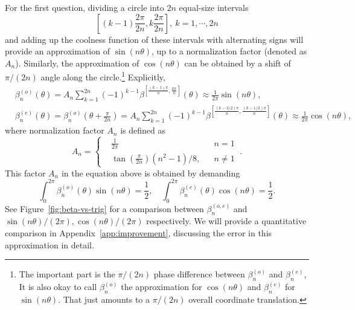 \documentclass[12pt, nofootinbib]{article}
\theoremstyle{plain}
\theoremstyle{assumption}
\theoremstyle{definition}
\theoremstyle{plain}
\theoremstyle{plain}
\theoremstyle{plain}
\theoremstyle{plain}
\theoremstyle{plain}
\def\({\left(}
\def\){\right)}
\def\[{\left[}
\def\]{\right]}
\def\betae{\beta^{(e)}}
\def\betao{\beta^{(o)}}
\begin{document}
For the first question, dividing a circle into $2n$ equal-size intervals 
$$\left[(k-1)\frac{2\pi}{2n}, k\frac{2\pi}{2n} \right],~k=1,\cdots,2n$$ 
and adding up the coolness function of these intervals with alternating signs will provide an approximation of $\sin(n\theta)$, up to a normalization factor (denoted as $A_n$). Similarly, the approximation of $\cos(n\theta)$ can be obtained by a shift of $\pi/(2n)$ angle along the circle.\footnote{The important part is the $\pi/(2n)$ phase difference between $\beta^{(o)}_n$ and $\beta^{(e)}_n$, It is also okay to call $\beta^{(o)}_n$ the approximation for $\cos(n\theta)$ and $\beta^{(e)}_n$ for $\sin(n\theta)$. That just amounts to a $\pi/(2n)$ overall coordinate translation.}  Explicitly,  
\begin{equation}\label{eq:betan}\begin{split}
    &\betao_n(\theta) = A_n\sum_{k=1}^{2n} (-1)^{k-1}\beta^{\[\frac{(k-1)\pi}{n}, \frac{k\pi}{n} \] }(\theta)\approx \frac{1}{2\pi}\sin(n\theta),\\ 
    &\betae_n(\theta)= \betao_n\(\theta+\frac{\pi}{2n}\) = A_n\sum_{k=1}^{2n} (-1)^{k-1}\beta^{\[\frac{(k-3/2)\pi}{n}, \frac{(k-1/2)\pi}{n} \] }(\theta)\approx  \frac{1}{2\pi}\cos(n\theta),
\end{split}
\end{equation}
where normalization factor $A_n$ is defined as
\begin{equation}\label{eq:An}
    A_n = \left\{ \begin{aligned}
        & \frac{1}{2\pi} &   &n = 1 \\ 
        &  \tan\( \frac{\pi}{2n} \)(n^2-1)/8,& &n\neq 1  
    \end{aligned}\right. ~.
\end{equation}
This factor $A_n$ in the equation above is obtained by demanding 
\begin{equation}
    \int_0^{2\pi} \beta^{(o)}_n(\theta)\sin(n\theta)=\frac{1}{2},\quad  \int_0^{2\pi} \beta^{(e)}_n(\theta)\cos(n\theta)=\frac{1}{2}.  
\end{equation}
See Figure~\ref{fig:beta-vs-trig} for a comparison between $\beta^{(o,e)}_n$ and $\sin(n\theta)/(2\pi),\cos(n\theta)/(2\pi)$ respectively. We will provide a quantitative comparison in Appendix~\ref{app:improvement}, discussing the error in this approximation in detail. 
\end{document}
